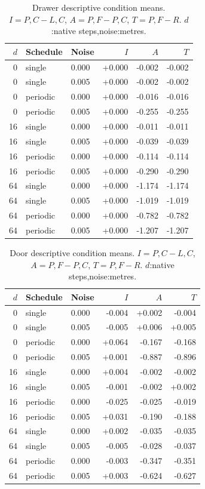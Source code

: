 \begin{table}[H]\centering\small
\caption{Drawer descriptive condition means. $I=P,C-L,C$, $A=P,F-P,C$, $T=P,F-R$. $d$:native steps,noise:metres.}\label{s-tab:drawerbreak}
\begin{tabular}{rllrrr}
\toprule $d$ & Schedule & Noise & $I$ & $A$ & $T$\\\midrule
0 & single & 0.000 & +0.000 & -0.002 & -0.002\\
0 & single & 0.005 & +0.000 & -0.002 & -0.002\\
0 & periodic & 0.000 & +0.000 & -0.016 & -0.016\\
0 & periodic & 0.005 & +0.000 & -0.255 & -0.255\\
16 & single & 0.000 & +0.000 & -0.011 & -0.011\\
16 & single & 0.005 & +0.000 & -0.039 & -0.039\\
16 & periodic & 0.000 & +0.000 & -0.114 & -0.114\\
16 & periodic & 0.005 & +0.000 & -0.290 & -0.290\\
64 & single & 0.000 & +0.000 & -1.174 & -1.174\\
64 & single & 0.005 & +0.000 & -1.019 & -1.019\\
64 & periodic & 0.000 & +0.000 & -0.782 & -0.782\\
64 & periodic & 0.005 & +0.000 & -1.207 & -1.207\\
\bottomrule\end{tabular}\end{table}
\begin{table}[H]\centering\small
\caption{Door descriptive condition means. $I=P,C-L,C$, $A=P,F-P,C$, $T=P,F-R$. $d$:native steps,noise:metres.}\label{s-tab:doorbreak}
\begin{tabular}{rllrrr}
\toprule $d$ & Schedule & Noise & $I$ & $A$ & $T$\\\midrule
0 & single & 0.000 & -0.004 & +0.002 & -0.004\\
0 & single & 0.005 & -0.005 & +0.006 & +0.005\\
0 & periodic & 0.000 & +0.064 & -0.167 & -0.168\\
0 & periodic & 0.005 & +0.001 & -0.887 & -0.896\\
16 & single & 0.000 & +0.004 & -0.002 & -0.002\\
16 & single & 0.005 & -0.001 & -0.002 & +0.002\\
16 & periodic & 0.000 & -0.025 & -0.025 & -0.019\\
16 & periodic & 0.005 & +0.031 & -0.190 & -0.188\\
64 & single & 0.000 & +0.002 & -0.035 & -0.035\\
64 & single & 0.005 & -0.005 & -0.028 & -0.037\\
64 & periodic & 0.000 & -0.003 & -0.347 & -0.351\\
64 & periodic & 0.005 & +0.003 & -0.624 & -0.627\\
\bottomrule\end{tabular}\end{table}

